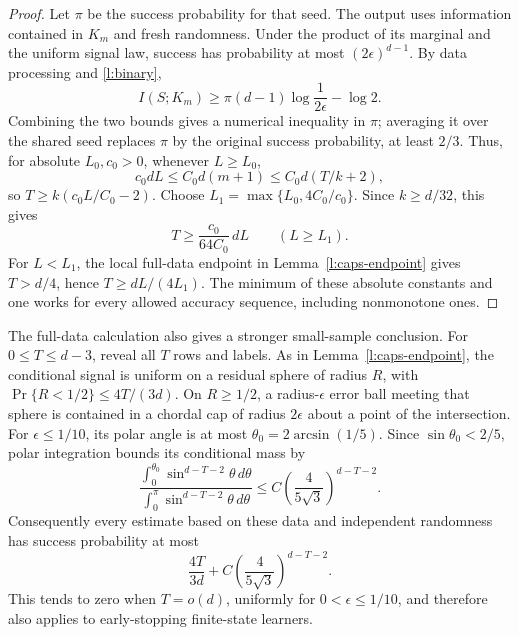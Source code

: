 \begin{proof}
Let \(\pi\) be the success probability for that seed.  The output
uses information contained in \(K_m\) and fresh randomness.  Under
the product of its marginal and the uniform signal law, success
has probability at most \((2\epsilon)^{d-1}\).  By data processing
and \eqref{l:binary},
\[
 I(S;K_m)\ge
 \pi(d-1)\log\frac1{2\epsilon}-\log2.
\]
Combining the two bounds gives a numerical inequality in \(\pi\);
averaging it over the shared seed replaces \(\pi\) by the original
success probability, at least \(2/3\).  Thus, for absolute
\(L_0,c_0>0\), whenever \(L\ge L_0\),
\[
 c_0dL\le C_0d(m+1)\le C_0d(T/k+2),
\]
so \(T\ge k(c_0L/C_0-2)\).  Choose
\(L_1=\max\{L_0,4C_0/c_0\}\).  Since \(k\ge d/32\), this gives
\[
 T\ge \frac{c_0}{64C_0}\,dL\qquad(L\ge L_1).
\]
For \(L<L_1\), the local full-data endpoint in
Lemma~\ref{l:caps-endpoint} gives \(T>d/4\), hence
\(T\ge dL/(4L_1)\).  The minimum of these absolute constants and
one works for every allowed accuracy sequence, including
nonmonotone ones.
\end{proof}

\begin{remark}
The full-data calculation also gives a stronger small-sample
conclusion.  For \(0\le T\le d-3\), reveal all \(T\) rows and
labels.  As in Lemma~\ref{l:caps-endpoint}, the conditional signal
is uniform on a residual sphere of radius \(R\), with
\(\Pr\{R<1/2\}\le4T/(3d)\).  On \(R\ge1/2\), a radius-\(\epsilon\)
error ball meeting that sphere is contained in a chordal cap of
radius \(2\epsilon\) about a point of the intersection.  For
\(\epsilon\le1/10\), its polar angle is at most
\(\theta_0=2\arcsin(1/5)\).  Since \(\sin\theta_0<2/5\), polar
integration bounds its conditional mass by
\[
 \frac{\int_0^{\theta_0}\sin^{d-T-2}\theta\,d\theta}
      {\int_0^\pi\sin^{d-T-2}\theta\,d\theta}
 \le C\left(\frac4{5\sqrt3}\right)^{d-T-2}.
\]
Consequently every estimate based on these data and independent
randomness has success probability at most
\[
 \frac{4T}{3d}+C\left(\frac4{5\sqrt3}\right)^{d-T-2}.
\]
This tends to zero when \(T=o(d)\), uniformly for
\(0<\epsilon\le1/10\), and therefore also applies to early-stopping
finite-state learners.
\end{remark}
